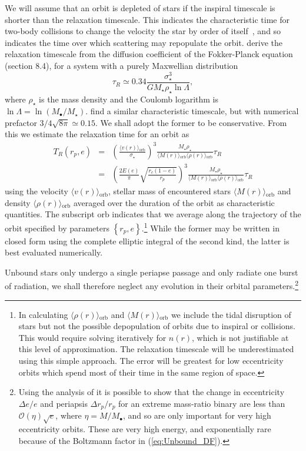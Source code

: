 \documentclass[useAMS,usedcolumn,usegraphicx,usenatbib]{mn2e}
\newcommand{\eqnref}[1]{(\ref{eq:#1})}
\newcommand{\sub}[1]{\ensuremath{_\mathrm{#1}}}
\newcommand{\order}[1]{\ensuremath{\mathcal{O}({#1})}}
\begin{document}
We will assume that an orbit is depleted of stars if the inspiral timescale is shorter than the relaxation timescale. This indicates the characteristic time for two-body collisions to change the velocity the star by order of itself~\citep{Binney1987}, and so indicates the time over which scattering may repopulate the orbit. \citet{Binney1987} derive the relaxation timescale from the diffusion coefficient of the Fokker-Planck equation (section 8.4), for a system with a purely Maxwellian distribution
\begin{equation}
\tau_R \simeq 0.34\frac{\sigma_\star^3}{GM_\star\rho_\star\ln\Lambda},
\end{equation}
where $\rho_\star$ is the mass density and the Coulomb logarithm is $\ln\Lambda = \ln(M_\bullet/M_\star)$. \citet{Bahcall1977} find a similar characteristic timescale, but with numerical prefactor $3/4\sqrt{8\pi} \simeq 0.15$. We shall adopt the former to be conservative. From this we estimate the relaxation time for an orbit as
\begin{eqnarray}
T_R(r_p,e) & = & \left(\frac{\langle v(r)\rangle\sub{orb}}{\sigma_\star}\right)^3\frac{M_\star\rho_\star}{\langle M(r)\rangle\sub{orb}\langle \rho(r)\rangle\sub{orb}}\tau_R\\
 & = & \left(\frac{2 E(e)}{\pi}\sqrt{\frac{r_c(1 - e)}{r_p}}\right)^{3}\frac{M_\star\rho_\star}{\langle M(r)\rangle\sub{orb}\langle \rho(r)\rangle\sub{orb}}\tau_R
\end{eqnarray}
using the velocity $\langle v(r)\rangle\sub{orb}$, stellar mass of encountered stars $\langle M(r)\rangle\sub{orb}$ and density $\langle \rho(r)\rangle\sub{orb}$ averaged over the duration of the orbit as characteristic quantities. The subscript $\mathrm{orb}$ indicates that we average along the trajectory of the orbit specified by parameters $\left\{r_p,e\right\}$.\footnote{In calculating $\langle \rho(r)\rangle\sub{orb}$ and $\langle M(r)\rangle\sub{orb}$ we include the tidal disruption of stars but not the possible depopulation of orbits due to inspiral or collisions. This would require solving iteratively for $n(r)$, which is not justifiable at this level of approximation. The relaxation timescale will be underestimated using this simple approach. The error will be greatest for low eccentricity orbits which spend most of their time in the same region of space.} While the former may be written in closed form using the complete elliptic integral of the second kind, the latter is best evaluated numerically.

Unbound stars only undergo a single periapse passage and only radiate one burst of radiation, we shall therefore neglect any evolution in their orbital parameters.\footnote{Using the analysis of \citet{Turner1977} it is possible to show that the change in eccentricity $\Delta e / e$ and periapsis $\Delta r_p / r_p$ for an extreme mass-ratio binary are less than $\order{\eta}\sqrt{e}$, where $\eta = M/M_\bullet$, and so are only important for very high eccentricity orbits. These are very high energy, and exponentially rare because of the Boltzmann factor in \eqnref{Unbound_DF}.}
\end{document}
